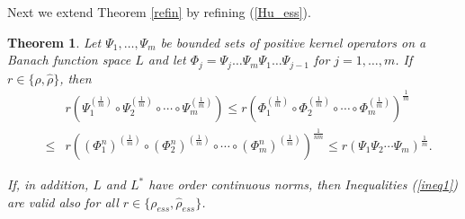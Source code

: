 \documentclass[12pt, reqno]{amsart}
\newtheorem{theorem}{Theorem}[section]
\theoremstyle{definition}
\theoremstyle{remark}
\numberwithin{equation}{section}
\begin{document}
Next we extend  Theorem \ref{refin} by refining (\ref{Hu_ess}). %
\begin{theorem}
\label{kathyth1}
 Let $\Psi _1, \ldots , \Psi _m$ be bounded sets of positive kernel operators on a Banach function space $L$ and let
 $ \Phi _j=\Psi_j\ldots\Psi_m \Psi_1\ldots\Psi_{j-1}$ for $j=1,\ldots , m$. %
 If $r\in \{ \rho, \hat{\rho}\}$, then 
\begin{eqnarray}
\nonumber
& & r \left(\Psi _1 ^{\left( \frac{1}{m} \right)} \circ\Psi _2^{\left( \frac{1}{m} \right)}\circ\cdots\circ \Psi _m  ^{\left( \frac{1}{m} \right)} \right)
 \le r \left(\Phi _1^{\left( \frac{1}{m} \right)} \circ\Phi_2^{\left( \frac{1}{m} \right)}\circ\cdots\circ \Phi _m ^{\left( \frac{1}{m} \right)} \right)^{\frac{1}{m}}\\
&\le & r\left(\left(\Phi_1^{n}\right)^{(\frac{1}{m})}\circ (\Phi_2^{n})^{(\frac{1}{m})} \circ \cdots\circ
\left(\Phi_m^{n}\right)^{(\frac{1}{m})}\right)^{\frac{1}{nm}}\le r(\Psi_1 \Psi _2\cdots\Psi_m)^{\frac{1}{m}}.
\label{ineq1}
\end{eqnarray}

If, in addition, $L$ and $L^*$ have order continuous norms, then Inequalities (\ref{ineq1}) are valid also for all $r\in \{\rho_{ess}, \hat{\rho} _{ess}\}$.
\label{REFfr}
\end{theorem}
\end{document}
